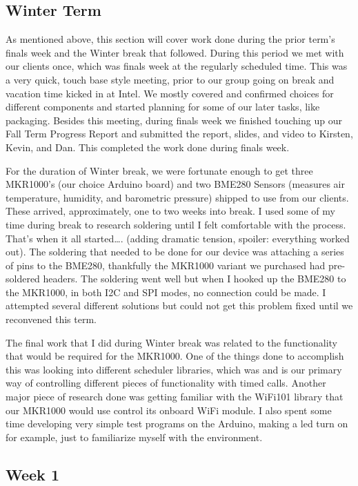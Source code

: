 \documentclass[IEEEtran,letterpaper,10pt,titlepage,fleqn,draftclsnofoot,onecolumn]{article}
\begin{document}
\subsection{Winter Term}

As mentioned above, this section will cover work done during the prior term’s finals week and the Winter break that followed. During this period we met with our clients once, which was finals week at the regularly scheduled time. This was a very quick, touch base style meeting, prior to our group going on break and vacation time kicked in at Intel. We mostly covered and confirmed choices for different components and started planning for some of our later tasks, like packaging. Besides this meeting, during finals week we finished touching up our Fall Term Progress Report and submitted the report, slides, and video to Kirsten, Kevin, and Dan. This completed the work done during finals week.

For the duration of Winter break, we were fortunate enough to get three MKR1000’s (our choice Arduino board) and two BME280 Sensors (measures air temperature, humidity, and barometric pressure) shipped to use from our clients. These arrived, approximately, one to two weeks into break. I used some of my time during break to research soldering until I felt comfortable with the process. That’s when it all started…. (adding dramatic tension, spoiler: everything worked out). The soldering that needed to be done for our device was attaching a series of pins to the BME280, thankfully the MKR1000 variant we purchased had pre-soldered headers. The soldering went well but when I hooked up the BME280 to the MKR1000, in both I2C and SPI modes, no connection could be made. I attempted several different solutions but could not get this problem fixed until we reconvened this term.

The final work that I did during Winter break was related to the functionality that would be required for the MKR1000. One of the things done to accomplish this was looking into different scheduler libraries, which was and is our primary way of controlling different pieces of functionality with timed calls. Another major piece of research done was getting familiar with the WiFi101 library that our MKR1000 would use control its onboard WiFi module. I also spent some time developing very simple test programs on the Arduino, making a led turn on for example, just to familiarize myself with the environment. 

\subsection{Week 1}
\end{document}
